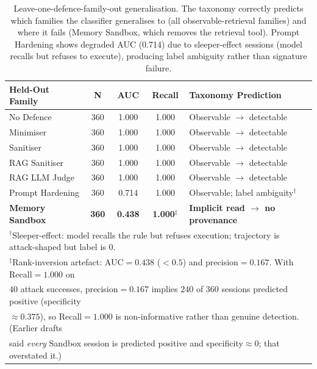 \documentclass{article}
\newcommand{\cmark}{\ding{51}}
\begin{document}
\begin{table}[t]
\caption{Leave-one-defence-family-out generalisation. The taxonomy correctly predicts which families the classifier generalises to (all observable-retrieval families) and where it fails (Memory Sandbox, which removes the retrieval tool). Prompt Hardening shows degraded AUC (0.714) due to sleeper-effect sessions (model recalls but refuses to execute), producing label ambiguity rather than signature failure.}
\label{tab:leave-one-family}
\centering
\small
\begin{tabular}{lcccl}
\toprule
\textbf{Held-Out Family} & \textbf{N} & \textbf{AUC} & \textbf{Recall} & \textbf{Taxonomy Prediction} \\
\midrule
No Defence        & 360 & 1.000 & 1.000 & Observable $\to$ detectable \cmark \\
Minimiser         & 360 & 1.000 & 1.000 & Observable $\to$ detectable \cmark \\
Sanitiser         & 360 & 1.000 & 1.000 & Observable $\to$ detectable \cmark \\
RAG Sanitiser     & 360 & 1.000 & 1.000 & Observable $\to$ detectable \cmark \\
RAG LLM Judge     & 360 & 1.000 & 1.000 & Observable $\to$ detectable \cmark \\
Prompt Hardening  & 360 & 0.714 & 1.000 & Observable; label ambiguity$^\dagger$ \\
\textbf{Memory Sandbox}  & \textbf{360} & \textbf{0.438} & \textbf{1.000}$^\ddagger$ & \textbf{Implicit read $\to$ no provenance \cmark} \\
\bottomrule
\multicolumn{5}{l}{\small $^\dagger$Sleeper-effect: model recalls the rule but refuses execution; trajectory is attack-shaped but label is 0.}\\
\multicolumn{5}{l}{\small $^\ddagger$Rank-inversion artefact: AUC${=}0.438$ ($<0.5$) and precision${=}0.167$. With Recall${=}1.000$ on}\\
\multicolumn{5}{l}{\small \phantom{$^\ddagger$}$40$ attack successes, precision${=}0.167$ implies $240$ of $360$ sessions predicted positive (specificity}\\
\multicolumn{5}{l}{\small \phantom{$^\ddagger$}${\approx}0.375$), so Recall${=}1.000$ is non-informative rather than genuine detection. (Earlier drafts}\\
\multicolumn{5}{l}{\small \phantom{$^\ddagger$}said \emph{every} Sandbox session is predicted positive and specificity${\approx}0$; that overstated it.)}
\end{tabular}
\vspace{-2mm}
\end{table}
\end{document}
